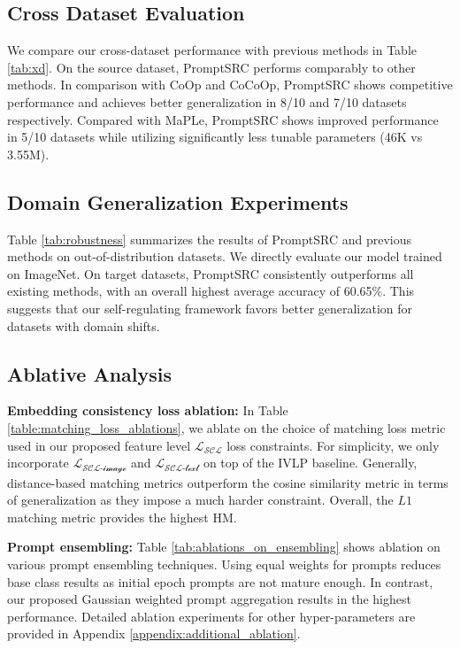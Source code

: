 \documentclass[10pt,twocolumn,letterpaper]{article}
\begin{document}



\subsection{Cross Dataset Evaluation}
We compare our cross-dataset performance with previous methods in Table \ref{tab:xd}. On the source dataset, PromptSRC performs comparably to other methods. In comparison with CoOp and CoCoOp, PromptSRC shows competitive performance and achieves better generalization in 8/10 and 7/10 datasets respectively. {Compared with MaPLe, PromptSRC shows improved performance in 5/10 datasets while utilizing significantly less tunable parameters (46K vs 3.55M).} 

\subsection{Domain Generalization Experiments}
Table \ref{tab:robustness} summarizes the results of PromptSRC and previous methods on out-of-distribution datasets. We directly evaluate our model trained on ImageNet. On target datasets, PromptSRC consistently outperforms all existing methods, with an overall highest average accuracy of 60.65\%. This suggests that our self-regulating framework favors better generalization for datasets with domain shifts.



\subsection{Ablative Analysis}
\label{sec:experiments:ablation_experiments}


\noindent \textbf{Embedding consistency loss ablation:}
In Table \ref{table:matching_loss_ablations}, we ablate on the choice of matching loss metric used in our proposed feature level $\mathcal{L_{\text{SCL}}}$ loss constraints. For simplicity, we only incorporate $\mathcal{L_{\text{SCL-image}}}$ and $\mathcal{L_{\text{SCL-text}}}$ on top of the IVLP baseline. Generally, distance-based matching metrics outperform the cosine similarity metric in terms of generalization as they impose a much harder constraint. Overall, the $L1$ matching metric provides the highest HM.

\noindent \textbf{Prompt ensembling:}
Table \ref{tab:ablations_on_ensembling} shows ablation on various prompt ensembling techniques. Using equal weights for prompts reduces base class results as initial epoch prompts are not mature enough. In contrast, our proposed Gaussian weighted prompt aggregation results in the highest performance. Detailed ablation experiments for other hyper-parameters are provided in Appendix \ref{appendix:additional_ablation}.


\end{document}
